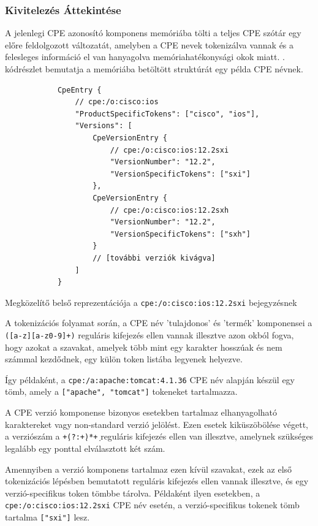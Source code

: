 \documentclass[a4paper,12pt]{article}
\begin{document}
\subsubsection{Kivitelezés Áttekintése}
	
	A jelenlegi CPE azonosító komponens memóriába tölti a teljes CPE szótár egy előre feldolgozott változatát, amelyben a CPE nevek tokenizálva vannak és a felesleges információ el van hanyagolva memóriahatékonysági okok miatt. \Az{\ref{ciscotokens}}. kódrészlet bemutatja a memóriába betöltött struktúrát egy példa CPE névnek.
	
	\begin{listing}[H]
		\begin{verbatim}
			CpeEntry {
				// cpe:/o:cisco:ios
				"ProductSpecificTokens": ["cisco", "ios"],
				"Versions": [
					CpeVersionEntry {
						// cpe:/o:cisco:ios:12.2sxi
						"VersionNumber": "12.2",
						"VersionSpecificTokens": ["sxi"]
					},
					CpeVersionEntry {
						// cpe:/o:cisco:ios:12.2sxh
						"VersionNumber": "12.2",
						"VersionSpecificTokens": ["sxh"]
					}
					// [további verziók kivágva]
				]
			}
		\end{verbatim}
		\caption{Megközelítő belső reprezentációja a \texttt{cpe:/o:cisco:ios:12.2sxi} bejegyzésnek}
		\label{ciscotokens}
	\end{listing}
	
	A tokenizációs folyamat során, a CPE név 'tulajdonos' és 'termék' komponensei a \texttt{([a-z][a-z0-9]+)} reguláris kifejezés ellen vannak illesztve azon okból fogva, hogy azokat a szavakat, amelyek több mint egy karakter hosszúak és nem számmal kezdődnek, egy külön token listába legyenek helyezve.
	
	Így példaként, a \texttt{cpe:/a:apache:tomcat:4.1.36} CPE név alapján készül egy tömb, amely a \texttt{["apache", "tomcat"]} tokeneket tartalmazza.
	
	A CPE verzió komponense bizonyos esetekben tartalmaz elhanyagolható karaktereket vagy non-standard verzió jelölést. Ezen esetek kiküszöbölése végett, a verziószám a \texttt{\d+\.(?:\d+\.)*\d+} reguláris kifejezés ellen van illesztve, amelynek szükséges legalább egy ponttal elválasztott két szám.
	
	Amennyiben a verzió komponens tartalmaz ezen kívül szavakat, ezek az első tokenizációs lépésben bemutatott reguláris kifejezés ellen vannak illesztve, és egy verzió-specifikus token tömbbe tárolva. Példaként ilyen esetekben, a \texttt{cpe:/o:cisco:ios:12.2sxi} CPE név esetén, a verzió-specifikus tokenek tömb tartalma \texttt{["sxi"]} lesz.
	
\end{document}

